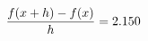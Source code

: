 \documentclass[preview]{standalone}
\begin{document}
\begin{align*}
\special{dvisvgm:raw <g id='unique000'>}\frac{f(x+h)-f(x)}{h} = 2.150\special{dvisvgm:raw </g>}
\end{align*}
\end{document}
